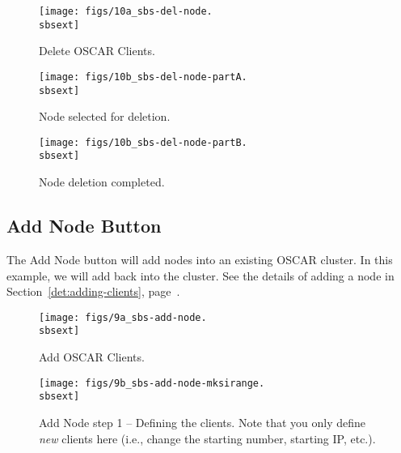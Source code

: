 \begin{figure}[h]
  \begin{center}
    \centerline{\texttt{[image: figs/10a\_sbs-del-node.\\sbsext]}}
    \caption{Delete OSCAR Clients.}
    \label{fig:sbs-del-node1}
  \end{center}
\end{figure}

\begin{figure}[htbp]
  \begin{center}
    \centerline{\texttt{[image: figs/10b\_sbs-del-node-partA.\\sbsext]}}
    \caption{Node selected for deletion.}
    \label{fig:sbs-del-node1-done-partA}
  \end{center}
\end{figure}

\begin{figure}[htbp]
  \begin{center}
    \centerline{\texttt{[image: figs/10b\_sbs-del-node-partB.\\sbsext]}}
    \caption{Node deletion completed.}
    \label{fig:sbs-del-node1-done-partB}
  \end{center}
\end{figure}

\clearpage



\subsection{Add Node Button}
\label{app:sbs-add-node}

The Add Node button will add nodes into an existing OSCAR cluster.  In
this example, we will add back  into the cluster.
See the details of adding a node in Section~\ref{det:adding-clients},
page~\pageref{det:adding-clients}.

\begin{figure}[h]
  \begin{center}
    \centerline{\texttt{[image: figs/9a\_sbs-add-node.\\sbsext]}}
    \caption{Add OSCAR Clients.}
    \label{fig:sbs-add-node1}
  \end{center}
\end{figure}

\begin{figure}[htbp]
  \begin{center}
    \centerline{\texttt{[image: figs/9b\_sbs-add-node-mksirange.\\sbsext]}}
    \caption[Add Node step 1 -- Defining the clients.]{Add Node step 1
      -- Defining the clients.  Note that you only define {\em new}
      clients here (i.e., change the starting number, starting IP,
      etc.).}
    \label{fig:sbs-add-node1-define-clients}
  \end{center}
\end{figure}

